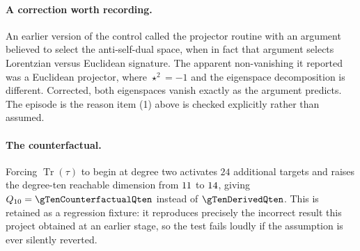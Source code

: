 \paragraph{A correction worth recording.}
An earlier version of the control called the projector routine with an argument
believed to select the anti-self-dual space, when in fact that argument selects
Lorentzian versus Euclidean signature. The apparent non-vanishing it reported was
a Euclidean projector, where $\star^2 = -1$ and the eigenspace decomposition is
different. Corrected, both eigenspaces vanish exactly as the argument predicts.
The episode is the reason item (1) above is checked explicitly rather than
assumed.

\paragraph{The counterfactual.}
Forcing $\operatorname{Tr}(\tau)$ to begin at degree two activates
$24$ additional targets and raises the degree-ten reachable dimension from
$11$ to $14$, giving $\Qten = \gTenCounterfactualQten$ instead of
$\gTenDerivedQten$. This is retained as a regression fixture: it reproduces
precisely the incorrect result this project obtained at an earlier stage, so the
test fails loudly if the assumption is ever silently reverted.
